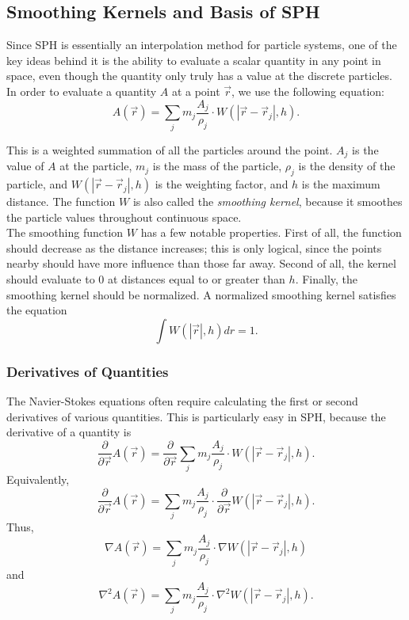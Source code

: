 \documentclass[a4paper,twocolumn]{article}
\begin{document}
\subsection{Smoothing Kernels and Basis of SPH}
Since SPH is essentially an interpolation method for particle systems, one of the key ideas behind it is the ability to evaluate a scalar quantity in any point in space, even though the quantity only truly has a value at the discrete particles. \\

In order to evaluate a quantity $A$ at a point $\vec r$, we use the following equation:
\[A(\vec r) = \sum_j m_j\frac{A_j}{\rho_j}\cdot W(|\vec r - \vec r_j|, h).\]

This is a weighted summation of all the particles around the point. $A_j$ is the value of $A$ at the particle, $m_j$ is the mass of the particle, $\rho_j$ is the density of the particle, and $W(|\vec r - \vec r_j|, h)$ is the weighting factor, and $h$ is the maximum distance. The function $W$ is also called the \emph{smoothing kernel}, because it smoothes the particle values throughout continuous space. \\


    The smoothing function $W$ has a few notable properties. First of all, the function should decrease as the distance increases; this is only logical, since the points nearby should have more influence than those far away. Second of all, the kernel should evaluate to 0 at distances equal to or greater than $h$. Finally, the smoothing kernel should be normalized. A normalized smoothing kernel satisfies the equation
\[\int W(|\vec r|, h) dr = 1.\]

\subsubsection{Derivatives of Quantities}
The Navier-Stokes equations often require calculating the first or second derivatives of various quantities. This is particularly easy in SPH, because the derivative of a quantity is
\[\frac{\partial}{\partial \vec r} A(\vec r) = \frac{\partial}{\partial \vec r} \sum_j m_j\frac{A_j}{\rho_j}\cdot W(|\vec r - \vec r_j|, h).\]
Equivalently,
\[\frac{\partial}{\partial \vec r} A(\vec r) = \sum_j m_j\frac{A_j}{\rho_j}\cdot \frac{\partial}{\partial \vec r} W(|\vec r - \vec r_j|, h).\]
Thus,
\[\nabla A(\vec r) = \sum_j m_j\frac{A_j}{\rho_j}\cdot \nabla W(|\vec r - \vec r_j|, h)\]
and
\[\nabla^2 A(\vec r) = \sum_j m_j\frac{A_j}{\rho_j}\cdot \nabla^2 W(|\vec r - \vec r_j|, h).\]
\end{document}
